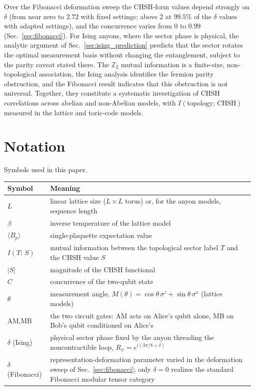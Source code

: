 \documentclass[aps,pra,twocolumn,superscriptaddress,showpacs,floatfix]{revtex4-2}
\newcommand{\Ztwo}{\mathbb{Z}_2}
\newcommand{\MI}{I(T;\,S)}
\begin{document}
Over the Fibonacci deformation sweep the CHSH-form values depend strongly on
$\delta$ (from near zero to $2.72$ with fixed settings; above 2 at $99.5\%$ of
the $\delta$ values with adapted settings), and the concurrence varies from
$0$ to $0.99$ (Sec.~\ref{sec:fibonacci}). For Ising anyons, where the sector
phase is physical, the analytic argument of Sec.~\ref{sec:ising_prediction}
predicts that the sector rotates the optimal measurement basis without
changing the entanglement, subject to the parity caveat stated there. The $\Ztwo$
mutual information is a finite-size, non-topological association, the Ising
analysis identifies the fermion parity obstruction, and the Fibonacci result
indicates that this obstruction is not universal. Together, they constitute a
systematic investigation of CHSH correlations across abelian and non-Abelian
models, with $I(\text{topology};\,\text{CHSH})$ measured in the lattice and
toric-code models.

\section*{Notation}
\noindent Symbols used in this paper.
\begin{ruledtabular}
\begin{tabular}{l p{}}
Symbol & Meaning \\
\hline
$L$ & linear lattice size ($L\times L$ torus) or, for the anyon models, sequence length \\
$\beta$ & inverse temperature of the lattice model \\
$\langle B_p\rangle$ & single-plaquette expectation value \\
$\MI$ & mutual information between the topological sector label $T$ and the CHSH value $S$ \\
$|S|$ & magnitude of the CHSH functional \\
$C$ & concurrence of the two-qubit state \\
$\theta$ & measurement angle, $M(\theta)=\cos\theta\,\sigma^z+\sin\theta\,\sigma^x$ (lattice models) \\
$\text{AM},\text{MB}$ & the two circuit gates: AM acts on Alice's qubit alone, MB on Bob's qubit conditioned on Alice's \\
$\delta$ (Ising) & physical sector phase fixed by the anyon threading the noncontractible loop, $R_\psi=e^{i(3\pi/8+\delta)}$ \\
$\delta$ (Fibonacci) & representation-deformation parameter varied in the deformation sweep of Sec.~\ref{sec:fibonacci}; only $\delta = 0$ realizes the standard Fibonacci modular tensor category \\
\end{tabular}
\end{ruledtabular}
\end{document}
